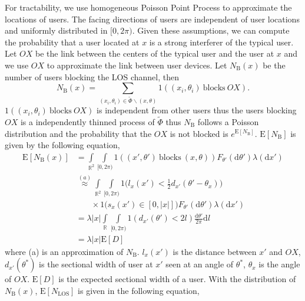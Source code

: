 \documentclass[10pt, conference, letterpaper]{IEEEtran}
\begin{document}
For tractability, we use homogeneous Poisson Point Process to approximate the locations of users. The facing directions of users are independent of user locations and uniformly distributed in $[0, 2\pi)$. Given these assumptions, we can compute the probability that a user located at $x$ is a strong interferer of the typical user. Let $OX$ be the link between the centers of the typical user and the user at $x$ and we use $OX$ to approximate the link between user devices. Let $N_{\mathrm{B}}(x)$ be the number of users blocking the LOS channel, then 
\begin{equation*}
N_{\mathrm{B}}(x) = \sum_{(x_i, \theta_i)\in \tilde{\Phi}\backslash(x,\theta)}1((x_i, \theta_i) \mathrm{~blocks~} OX).
\end{equation*}
$1((x_i, \theta_i) \mathrm{~blocks~} OX)$ is independent from other users thus the users blocking $OX$ is a independently thinned process of $\tilde{\Phi}$ thus $N_{\mathrm{B}}$ follows a Poisson distribution and the probability that the $OX$ is not blocked is $e^{\mathrm{E}[N_{\mathrm{B}}]}$. $\mathrm{E}[N_{\mathrm{B}}]$ is given by the following equation, 
\begin{align}
\mathrm{E}[N_{\mathrm{B}}(x)] & =  \int\limits_{\mathbb{R}^2}\int\limits_{[0,2\pi)}\mathrm{1}((x',\theta')\mathrm{~blocks~}(x,\theta))F_{\theta'}(\mathrm{d}\theta')\lambda(\mathrm{d}x') \nonumber\\
& \stackrel{(a)}{\approx} \int\limits_{\mathbb{R}^2}\int\limits_{[0,2\pi)}\mathrm{1}\big(l_{x}(x') < \frac{1}{2}d_{x'}(\theta' - \theta_{x})\big) \nonumber\\
& \phantom{{}=1} \times \mathrm{1}\big(s_{x}(x')\in[0,|x|]\big) F_{\theta'}(\mathrm{d}\theta')\lambda(\mathrm{d}x') \label{eq:2dblocking} \\
& = \lambda|x|\int\limits_{\mathbb{R}}\int\limits_{[0,2\pi)}\mathrm{1}(d_{x'}(\theta')<2l)\frac{\mathrm{d}\theta'}{2\pi}\mathrm{d}l \nonumber\\
& = \lambda|x|\mathrm{E}[D] \label{eq:N_blockage_original}
\end{align}
where (a) is an approximation of $N_{\mathrm{B}}$. $l_x(x')$ is the distance between $x'$ and $OX$, $d_{x'}(\theta^\ast)$ is the sectional width of user at $x'$ seen at an angle of $\theta^\ast$, $\theta_x$ is the angle of $OX$. $\mathrm{E}[D]$ is the expected sectional width of a user.
With the distribution of $N_\mathrm{B}(x)$, $\mathrm{E}[N_{\mathrm{LOS}}]$ is given in the following equation, 
\end{document}
